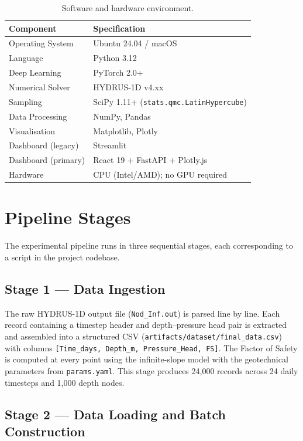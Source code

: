 \documentclass[12pt]{report}
\begin{document}
\begin{table}[htbp]
\centering
\begin{tabular}{ll}
\hline
\textbf{Component} & \textbf{Specification} \\
\hline
Operating System    & Ubuntu 24.04 / macOS \\
Language            & Python 3.12 \\
Deep Learning       & PyTorch 2.0+ \\
Numerical Solver    & HYDRUS-1D v4.xx \\
Sampling            & SciPy 1.11+ (\texttt{stats.qmc.LatinHypercube}) \\
Data Processing     & NumPy, Pandas \\
Visualisation       & Matplotlib, Plotly \\
Dashboard (legacy)  & Streamlit \\
Dashboard (primary) & React 19 + FastAPI + Plotly.js \\
Hardware            & CPU (Intel/AMD); no GPU required \\
\hline
\end{tabular}
\caption{Software and hardware environment.}
\label{tab:env}
\end{table}

\section{Pipeline Stages}

The experimental pipeline runs in three sequential stages, each
corresponding to a script in the project codebase.

\subsection{Stage 1 — Data Ingestion}

The raw HYDRUS-1D output file (\texttt{Nod\_Inf.out}) is parsed
line by line. Each record containing a timestep header and
depth--pressure head pair is extracted and assembled into a
structured CSV (\texttt{artifacts/dataset/final\_data.csv})
with columns \texttt{[Time\_days, Depth\_m, Pressure\_Head, FS]}.
The Factor of Safety is computed at every point using the
infinite-slope model with the geotechnical parameters from
\texttt{params.yaml}. This stage produces 24,000 records across
24 daily timesteps and 1,000 depth nodes.

\subsection{Stage 2 — Data Loading and Batch Construction}
\end{document}
